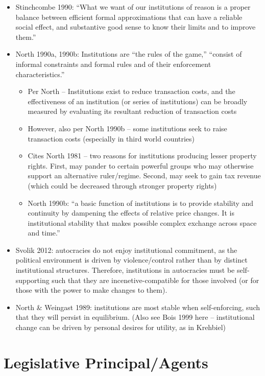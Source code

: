 \documentclass[12pt]{article}
\begin{document}
\begin{itemize}
    \item Stinchcombe 1990: ``What we want of our institutions of reason is a proper balance between efficient formal approximations that can have a reliable social effect, and substantive good sense to know their limits and to improve them.''
    \item North 1990a, 1990b: Institutions are ``the rules of the game,'' ``consist of informal constraints and formal rules and of their enforcement characteristics.''
    \begin{itemize}
        \item Per North -- Institutions exist to reduce transaction costs, and the effectiveness of an institution (or series of institutions) can be broadly measured by evaluating its resultant reduction of transaction costs
        \item However, also per North 1990b -- some institutions seek to raise transaction costs (especially in third world countries)
        \item Cites North 1981 -- two reasons for institutions producing lesser property rights. First, may pander to certain powerful groups who may otherwise support an alternative ruler/regime. Second, may seek to gain tax revenue (which could be decreased through stronger property rights)
        \item North 1990b: ``a basic function of institutions is to provide stability and continuity by dampening the effects of relative price changes. It is institutional stability that makes possible complex exchange across space and time.''
    \end{itemize}
    \item Svolik 2012: autocracies do not enjoy institutional commitment, as the political environment is driven by violence/control rather than by distinct institutional structures. Therefore, institutions in autocracies must be self-supporting such that they are incenetive-compatible for those involved (or for those with the power to make changes to them).
    \item North \& Weingast 1989: institutions are most stable when self-enforcing, such that they will persist in equilibrium. (Also see Bois 1999 here -- institutional change can be driven by personal desires for utility, as in Krehbiel)
\end{itemize}


\section*{Legislative Principal/Agents}
\end{document}
